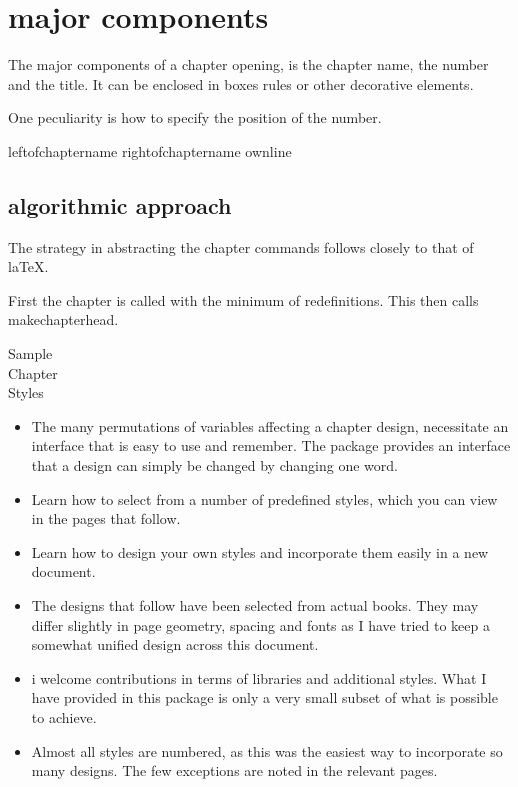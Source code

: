 \section{major components}

The major components of a chapter opening, is the chapter name, the number and the title. It can be enclosed in boxes rules or other decorative elements.

One peculiarity is how to specify the position of the number.

leftofchaptername rightofchaptername ownline

\subsection{algorithmic approach}

The strategy in abstracting the chapter commands follows closely to that of laTeX.

First the chapter is called with the minimum of redefinitions. This then calls makechapterhead.


\begin{specialchapter}[
     image=genetics-dogs,
     image caption={Labrador retriever\\
         puppies expressing\\
         brown (chocolate),\\
         golden (yellow),\\
         and black\\
         coat colors,\\
         traits controlled\\
         by two gene pairs.}]%
{Sample\\ Chapter\\ Styles}
\begin{itemize}
\item The many permutations of variables affecting a chapter design, necessitate an interface that is easy to use and remember. The package provides an interface that a design can simply be changed by changing one word.
\item Learn how to select from a number of predefined styles, which you can view in the pages that follow.
\item Learn how to design your own styles and incorporate them easily in a new document.
\item The designs that follow have been selected from actual books. They may differ slightly in page geometry, spacing and fonts as I have tried to keep a somewhat unified design across this document.
\item i welcome contributions in terms of libraries and additional styles. What I have provided in this package is only a very small subset of what is possible to achieve.
\item Almost all styles are numbered, as this was the easiest way to incorporate so many designs. The few exceptions are noted in the relevant pages.
  \end{itemize}
\clearpage
\end{specialchapter}
